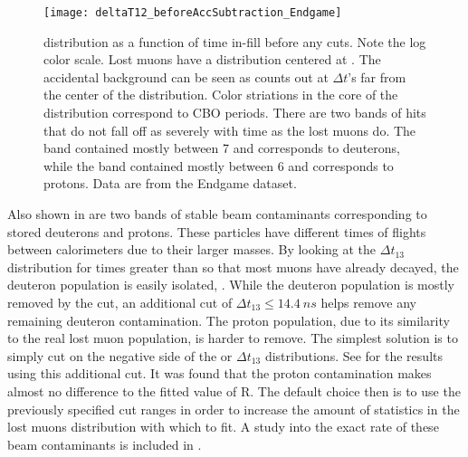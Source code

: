 
\begin{figure}
\centering
        \texttt{[image: deltaT12\_beforeAccSubtraction\_Endgame]}
\caption[Lost muon \DT distribution as a function of time in-fill]{\DT distribution as a function of time in-fill before any cuts. Note the log color scale. Lost muons have a \DT distribution centered at . The accidental background can be seen as counts out at $\Delta t$'s far from the center of the distribution. Color striations in the core of the distribution correspond to CBO periods. There are two bands of hits that do not fall off as severely with time as the lost muons do. The band contained mostly between 7 and  corresponds to deuterons, while the band contained mostly between 6 and  corresponds to protons. Data are from the Endgame dataset.}
\label{fig:deltaT12_AccSub}
\end{figure}


Also shown in  are two bands of stable beam contaminants corresponding to stored deuterons and protons. These particles have different times of flights between calorimeters due to their larger masses. By looking at the $\Delta t_{13}$ distribution for times greater than  so that most muons have already decayed, the deuteron population is easily isolated, . While the deuteron population is mostly removed by the \DT cut, an additional cut of $\Delta t_{13} \leq \SI{14.4}{ns}$ helps remove any remaining deuteron contamination. The proton population, due to its similarity to the real lost muon population, is harder to remove. The simplest solution is to simply cut on the negative side of the \DT or $\Delta t_{13}$ distributions. See  for the results using this additional cut. It was found that the proton contamination makes almost no difference to the fitted value of R. The default choice then is to use the previously specified cut ranges in order to increase the amount of statistics in the lost muons distribution with which to fit. A study into the exact rate of these beam contaminants is included in .


